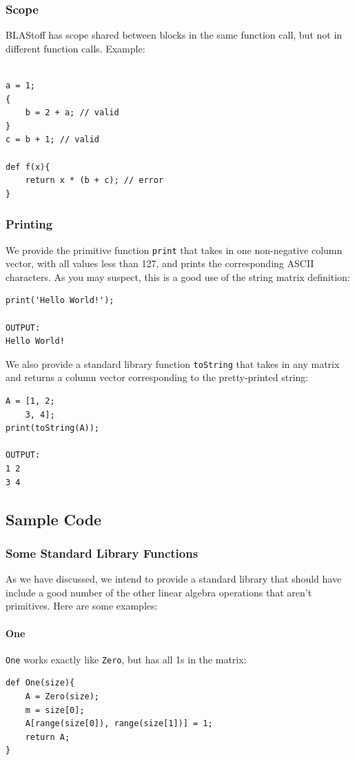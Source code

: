 \subsubsection{Scope}
BLAStoff has scope shared between blocks in the same function call, but not in different function calls.   Example:
\begin{lstlisting}

a = 1;
{
    b = 2 + a; // valid
}
c = b + 1; // valid

def f(x){
    return x * (b + c); // error
}
\end{lstlisting}

\subsubsection{Printing}
We provide the primitive function \verb=print= that takes in one non-negative column vector, with all values less than 127, and prints the corresponding ASCII characters.  As you may suspect, this is a good use of the string matrix definition:
\begin{lstlisting}
print('Hello World!');

OUTPUT:
Hello World!
\end{lstlisting}
We also provide a standard library function \verb=toString= that takes in any matrix and returns a column vector corresponding to the pretty-printed string:
\begin{lstlisting}
A = [1, 2;
    3, 4];
print(toString(A));

OUTPUT:
1 2
3 4
\end{lstlisting}

\subsection{Sample Code}

\subsubsection{Some Standard Library Functions}
As we have discussed, we intend to provide a standard library that should have include a good number of the other linear algebra operations that aren't primitives.  Here are some examples:

\paragraph{One}
\verb=One= works exactly like \verb=Zero=, but has all 1s in the matrix:
\begin{lstlisting}
def One(size){
    A = Zero(size);
    m = size[0];
    A[range(size[0]), range(size[1])] = 1;
    return A;
}
\end{lstlisting}

